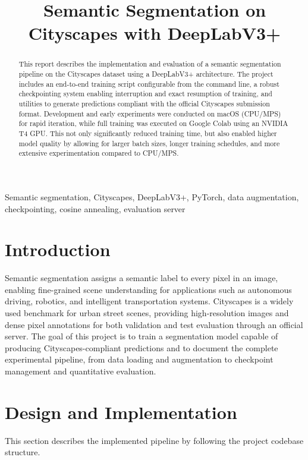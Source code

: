 \documentclass[conference]{IEEEtran}
\title{Semantic Segmentation on Cityscapes with DeepLabV3+}
\author{%
\IEEEauthorblockN{Francesco Albano}
\IEEEauthorblockA{%
Student ID: LJ2506219\\
School of Computer Science\\
Beihang University (BUAA)\\
Beijing, China\\
Email: francescoalbano@buaa.edu.cn, francescoalbano357@gmail.com
}}
\begin{document}
\pagestyle{fancy}
\fancyhead[C]{\textcolor{headergray}{Final Project – Student ID: LJ2506219 – Artificial Intelligence}}
\renewcommand{\headrulewidth}{0pt}
\fancyfoot[C]{\thepage}
\setlength{\footskip}{40pt}

\maketitle

\begin{abstract}
This report describes the implementation and evaluation of a semantic segmentation pipeline on the Cityscapes dataset using a DeepLabV3+ architecture. The project includes an end-to-end training script configurable from the command line, a robust checkpointing system enabling interruption and exact resumption of training, and utilities to generate predictions compliant with the official Cityscapes submission format. Development and early experiments were conducted on macOS (CPU/MPS) for rapid iteration, while full training was executed on Google Colab using an NVIDIA T4 GPU. This not only significantly reduced training time, but also enabled higher model quality by allowing for larger batch sizes, longer training schedules, and more extensive experimentation compared to CPU/MPS.
\end{abstract}

\begin{IEEEkeywords}
Semantic segmentation, Cityscapes, DeepLabV3+, PyTorch, data augmentation, checkpointing, cosine annealing, evaluation server
\end{IEEEkeywords}

\section{Introduction}
\label{sec:introduction}
Semantic segmentation assigns a semantic label to every pixel in an image, enabling fine-grained scene understanding for applications such as autonomous driving, robotics, and intelligent transportation systems. Cityscapes is a widely used benchmark for urban street scenes, providing high-resolution images and dense pixel annotations for both validation and test evaluation through an official server. The goal of this project is to train a segmentation model capable of producing Cityscapes-compliant predictions and to document the complete experimental pipeline, from data loading and augmentation to checkpoint management and quantitative evaluation.

\section{Design and Implementation}
\label{sec:design}
This section describes the implemented pipeline by following the project codebase structure.
\end{document}
